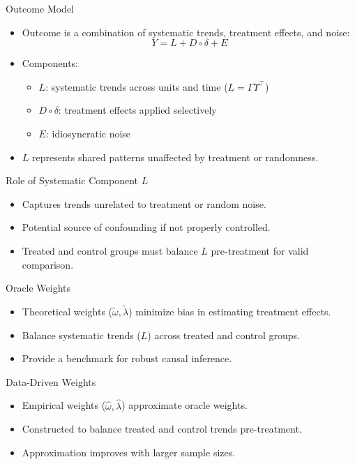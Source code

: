\documentclass{beamer}
\begin{document}
\begin{frame}{Outcome Model}
\begin{itemize}
\item Outcome is a combination of systematic trends, treatment effects, and noise:
\[
Y = L + D \circ \delta + E
\]
\item Components:
    \begin{itemize}
    \item \(L\): systematic trends across units and time (\(L = \Gamma \Upsilon^\top\))
    \item \(D \circ \delta\): treatment effects applied selectively
    \item \(E\): idiosyncratic noise
    \end{itemize}
\item \(L\) represents shared patterns unaffected by treatment or randomness.
\end{itemize}
\end{frame}

\begin{frame}{Role of Systematic Component \(L\)}
\begin{itemize}
\item Captures trends unrelated to treatment or random noise.
\item Potential source of confounding if not properly controlled.
\item Treated and control groups must balance \(L\) pre-treatment for valid comparison.
\end{itemize}
\end{frame}

\begin{frame}{Oracle Weights}
\begin{itemize}
\item Theoretical weights (\(\tilde{\omega}, \tilde{\lambda}\)) minimize bias in estimating treatment effects.
\item Balance systematic trends (\(L\)) across treated and control groups.
\item Provide a benchmark for robust causal inference.
\end{itemize}
\end{frame}

\begin{frame}{Data-Driven Weights}
\begin{itemize}
\item Empirical weights (\(\hat{\omega}, \hat{\lambda}\)) approximate oracle weights.
\item Constructed to balance treated and control trends pre-treatment.
\item Approximation improves with larger sample sizes.
\end{itemize}
\end{frame}
\end{document}
